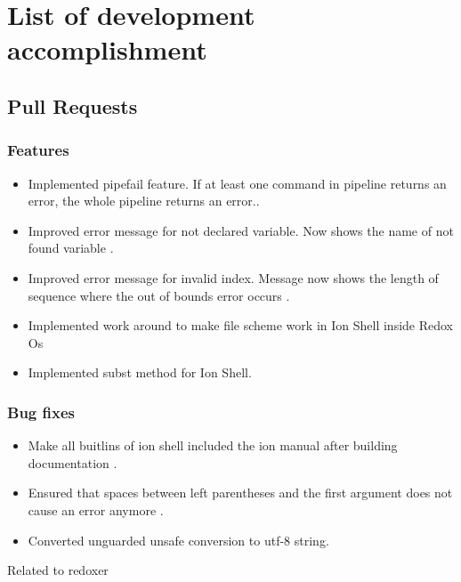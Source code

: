 \chapter{List of development accomplishment}

\section{Pull Requests}

\subsection{Features}

\begin{itemize}
	\item Implemented pipefail feature. If at least one command in pipeline returns an error, the whole pipeline returns an error.\cite{pr_pipefail}.
	\item Improved error message for not declared variable. Now shows the name of not found variable \cite{pr_better_not_found_variable_show}.
	\item Improved error message for invalid index. Message now shows the length of sequence where the out of bounds error occurs \cite{pr_error_message_shows_invalid_range}.
	\item Implemented work around to make file scheme work in Ion Shell inside Redox Os \cite{pr_file_scheme}
	\item Implemented subst method for Ion Shell. \cite{pr_subst_method}
\end{itemize}

\subsection{Bug fixes}

\begin{itemize}
	\item Make all buitlins of ion shell included the ion manual after building documentation \cite{pr_man_history_included_ion_manual}.
	\item Ensured that spaces between left parentheses and the first argument does not cause an error anymore .\cite{pr_fix_space_before_first_paranthese}
	\item Converted unguarded unsafe conversion to utf-8 string. \cite{pr_unsave_utf8_removal}
\end{itemize}

Related to \gls{redoxer}

